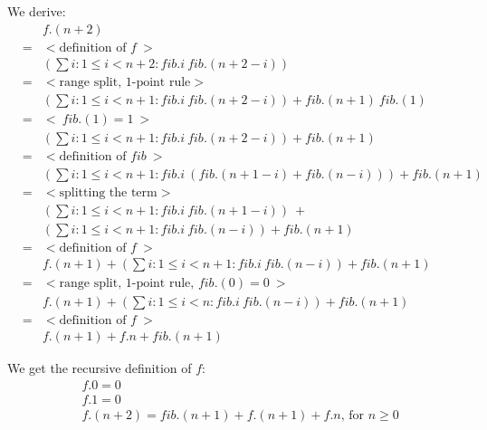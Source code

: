 We derive:
\[
\begin{array}{lcl}
		&&f.(n + 2) \\
	      &=& { < \text{definition of  } f\ >} \\      
                  && (\sum i: 1 \leq i < n + 2: \mathit{fib}.i\  \mathit{fib}.(n + 2 - i))\\
                &=& { < \text{range split, 1-point rule} >} \\
                  &&  (\sum i: 1 \leq i < n + 1: \mathit{fib}.i\  \mathit{fib}.(n + 2 - i)) + \mathit{fib}.(n+ 1)\  \mathit{fib}.(1) \\
                &=& { <\  \mathit{fib}.(1) = 1\  >} \\ 
                   && (\sum i: 1 \leq i < n + 1: \mathit{fib}.i\  \mathit{fib}.(n + 2 - i)) + \mathit{fib}.(n+ 1)\\
	       &=& { < \text{definition of } \mathit{fib}\ >} \\
	       	&& (\sum i: 1 \leq i < n + 1: \mathit{fib}.i\  (\mathit{fib}.(n + 1 - i) + \mathit{fib}.(n - i))) + \mathit{fib}.(n+ 1)\\
	      &=& { < \text{splitting the term} >} \\
	       	&& (\sum i: 1 \leq i < n + 1: \mathit{fib}.i\  \mathit{fib}.(n + 1 - i))\ + \\
		&& (\sum i: 1 \leq i < n + 1: \mathit{fib}.i\  \mathit{fib}.(n - i)) + \mathit{fib}.(n+ 1)\\	      &=& { < \text{definition of } f\ >} \\
	       	&& f.(n + 1) +  (\sum i: 1 \leq i < n + 1: \mathit{fib}.i\  \mathit{fib}.(n - i)) + \mathit{fib}.(n+ 1) \\
	      &=& { < \text{range split, 1-point rule, } \mathit{fib}.(0) = 0\  >} \\
                  && f.(n + 1) +  (\sum i: 1 \leq i < n: \mathit{fib}.i\  \mathit{fib}.(n - i)) + \mathit{fib}.(n+ 1) \\
               &=& { < \text{definition of } f\ >} \\
	       	&& f.(n + 1) +  f.n + \mathit{fib}.(n+ 1)   
   \end{array}
\]

We get the recursive definition of $f$:
\begin{equation*}
\begin{split}
& f.0 = 0 \\
& f.1 = 0 \\
& f.(n + 2) = \mathit{fib}.(n + 1) + f.(n + 1) + f.n \text{, for } n \geq 0
\end{split}   
\end{equation*}

